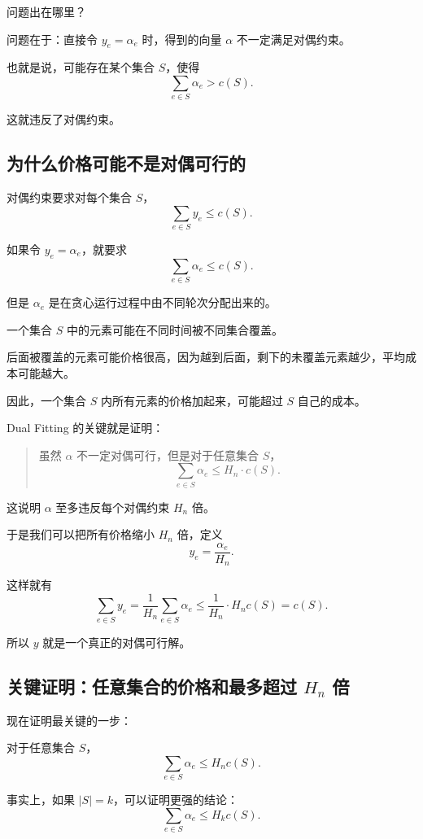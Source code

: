 \documentclass[UTF8,openany,12pt]{ctexbook}
\theoremstyle{remark}
\begin{document}
问题出在哪里？

问题在于：直接令 $y_e=\alpha_e$ 时，得到的向量 $\alpha$ 不一定满足对偶约束。

也就是说，可能存在某个集合 $S$，使得
\[
  \sum_{e\in S}\alpha_e > c(S).
\]

这就违反了对偶约束。

\subsection{为什么价格可能不是对偶可行的}

对偶约束要求对每个集合 $S$，
\[
  \sum_{e\in S} y_e \le c(S).
\]

如果令 $y_e=\alpha_e$，就要求
\[
  \sum_{e\in S} \alpha_e \le c(S).
\]

但是 $\alpha_e$ 是在贪心运行过程中由不同轮次分配出来的。

一个集合 $S$ 中的元素可能在不同时间被不同集合覆盖。

后面被覆盖的元素可能价格很高，因为越到后面，剩下的未覆盖元素越少，平均成本可能越大。

因此，一个集合 $S$ 内所有元素的价格加起来，可能超过 $S$ 自己的成本。

Dual Fitting 的关键就是证明：

\begin{quote}
  虽然 $\alpha$ 不一定对偶可行，但是对于任意集合 $S$，
  \[
    \sum_{e\in S}\alpha_e \le H_n\cdot c(S).
  \]
\end{quote}

这说明 $\alpha$ 至多违反每个对偶约束 $H_n$ 倍。

于是我们可以把所有价格缩小 $H_n$ 倍，定义
\[
  y_e = \frac{\alpha_e}{H_n}.
\]

这样就有
\[
  \sum_{e\in S}y_e
  =
  \frac1{H_n}\sum_{e\in S}\alpha_e
  \le
  \frac1{H_n}\cdot H_n c(S)
  =
  c(S).
\]

所以 $y$ 就是一个真正的对偶可行解。

\subsection[关键证明：任意集合的价格和最多超过 Hn 倍]{关键证明：任意集合的价格和最多超过 $H_n$ 倍}

现在证明最关键的一步：

对于任意集合 $S$，
\[
  \sum_{e\in S}\alpha_e \le H_n c(S).
\]

事实上，如果 $|S|=k$，可以证明更强的结论：
\[
  \sum_{e\in S}\alpha_e \le H_k c(S).
\]
\end{document}
